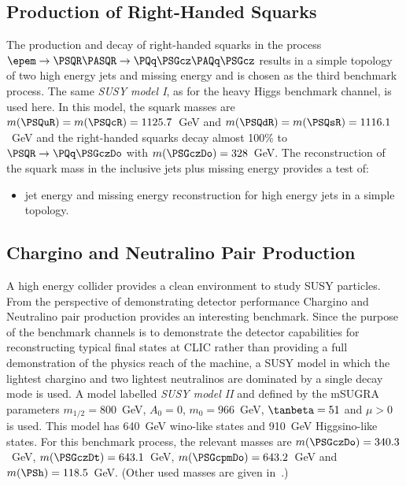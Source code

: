 \subsection{Production of Right-Handed Squarks}

The production and decay of right-handed squarks in the process
$\epem\rightarrow\PSQR\PASQR\rightarrow\PQq\PSGcz\PAQq\PSGcz$ results in a
simple topology of two high energy jets and missing energy and is chosen as the
third benchmark process. The same \textit{\acs{SUSY} model I}, as for
the heavy Higgs benchmark
channel, is used here. In this model, the squark masses are $m(\PSQuR) =
m(\PSQcR) = 1125.7$~GeV and $m(\PSQdR) =m(\PSQsR) = 1116.1$~GeV and the
right-handed squarks decay almost 100\% to $\PSQR\rightarrow\PQq\PSGczDo$ with
$m(\PSGczDo) = 328$~GeV. 
The reconstruction of the squark mass in the inclusive
jets plus missing energy provides a test of:
\begin{itemize}
   \item jet energy and missing energy reconstruction for high energy jets in a simple topology.
 \end{itemize}

 \subsection{Chargino and Neutralino Pair Production}
 
 A high energy \epem collider provides a clean environment to study SUSY
particles. From the perspective of demonstrating detector performance Chargino
and Neutralino pair production provides an interesting benchmark. Since the
purpose of the benchmark channels is to demonstrate the detector capabilities
for reconstructing typical final states at CLIC rather than providing a full
demonstration of the physics reach of the machine, a SUSY model in which the
lightest chargino and two lightest neutralinos are dominated by a single decay
mode is used. A model labelled \textit{\acs{SUSY} model II} and defined by the \acs{mSUGRA} parameters $m_{1/2}=800$~GeV,
$A_0=0$, $m_0=966$~GeV, $\tanbeta=51$ and $\mu>0$ is used. This model has
640~GeV wino-like states and 910~GeV Higgsino-like states. For this benchmark
process, the relevant masses are \mbox{$m(\PSGczDo) =
340.3$~GeV}, \mbox{$m(\PSGczDt) = 643.1$~GeV}, \mbox{$m(\PSGcpmDo) = 643.2$~GeV} and 
$m(\PSh) = 118.5$~GeV. 
(Other used masses are given in~\cite{lcd:2011-016}.)


